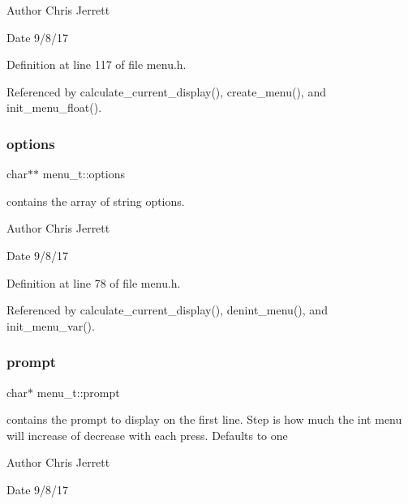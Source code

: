 \begin{DoxyAuthor}{Author}
Chris Jerrett 
\end{DoxyAuthor}
\begin{DoxyDate}{Date}
9/8/17 
\end{DoxyDate}


Definition at line 117 of file menu.\+h.



Referenced by calculate\+\_\+current\+\_\+display(), create\+\_\+menu(), and init\+\_\+menu\+\_\+float().

\mbox{\label{structmenu__t_ad695cd88051e34817f0f582d4e43c33a}} 
\subsubsection{\texorpdfstring{options}{options}}
{\footnotesize\ttfamily char$\ast$$\ast$ menu\+\_\+t\+::options}



contains the array of string options. 

\begin{DoxyAuthor}{Author}
Chris Jerrett 
\end{DoxyAuthor}
\begin{DoxyDate}{Date}
9/8/17 
\end{DoxyDate}


Definition at line 78 of file menu.\+h.



Referenced by calculate\+\_\+current\+\_\+display(), denint\+\_\+menu(), and init\+\_\+menu\+\_\+var().

\mbox{\label{structmenu__t_a7bf29a030b7ed4a623c6b445587cc647}} 
\subsubsection{\texorpdfstring{prompt}{prompt}}
{\footnotesize\ttfamily char$\ast$ menu\+\_\+t\+::prompt}



contains the prompt to display on the first line. Step is how much the int menu will increase of decrease with each press. Defaults to one 

\begin{DoxyAuthor}{Author}
Chris Jerrett 
\end{DoxyAuthor}
\begin{DoxyDate}{Date}
9/8/17 
\end{DoxyDate}


